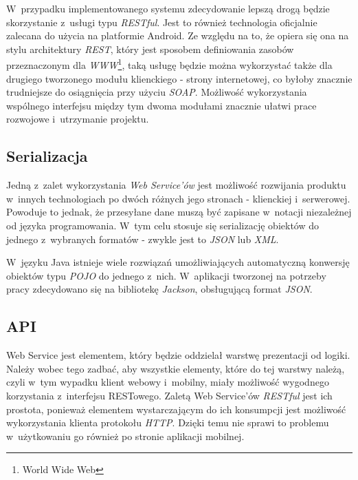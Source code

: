 \documentclass[11pt]{aghdpl}
\begin{document}
W~przypadku implementowanego systemu zdecydowanie lepszą drogą będzie skorzystanie z~usługi typu \emph{RESTful}. Jest to również technologia oficjalnie zalecana do użycia na platformie Android. Ze względu na to, że opiera się ona na stylu architektury \emph{REST}, który jest sposobem definiowania zasobów przeznaczonym dla \emph{WWW}\footnote{World Wide Web}, taką usługę będzie można wykorzystać także dla drugiego tworzonego modułu klienckiego - strony internetowej, co byłoby znacznie trudniejsze do osiągnięcia przy użyciu \emph{SOAP}. Możliwość wykorzystania wspólnego interfejsu między tym dwoma modułami znacznie ułatwi prace rozwojowe i~utrzymanie projektu.

\subsection{Serializacja}

Jedną z~zalet wykorzystania \emph{Web Service'ów} jest możliwość rozwijania produktu w~innych technologiach po dwóch różnych jego stronach - klienckiej i~serwerowej. Powoduje to jednak, że przesyłane dane muszą być zapisane w~notacji niezależnej od języka programowania. W~tym celu stosuje się serializację obiektów do jednego z~wybranych formatów - zwykle jest to \emph{JSON} lub \emph{XML}.

W~języku Java istnieje wiele rozwiązań umożliwiających automatyczną konwersję obiektów typu \emph{POJO} do jednego z~nich. W~aplikacji tworzonej na potrzeby pracy zdecydowano się na bibliotekę \emph{Jackson}, obsługującą format \emph{JSON}.

\subsection{API}

Web Service jest elementem, który będzie oddzielał warstwę prezentacji od logiki. Należy wobec tego zadbać, aby wszystkie elementy, które do tej warstwy należą, czyli w~tym wypadku klient webowy i~mobilny, miały możliwość wygodnego korzystania z~interfejsu RESTowego. Zaletą Web Service'ów \emph{RESTful} jest ich prostota, ponieważ elementem wystarczającym do ich konsumpcji jest możliwość wykorzystania klienta protokołu \emph{HTTP}. Dzięki temu nie sprawi to problemu w~użytkowaniu go również po stronie aplikacji mobilnej.
\end{document}
